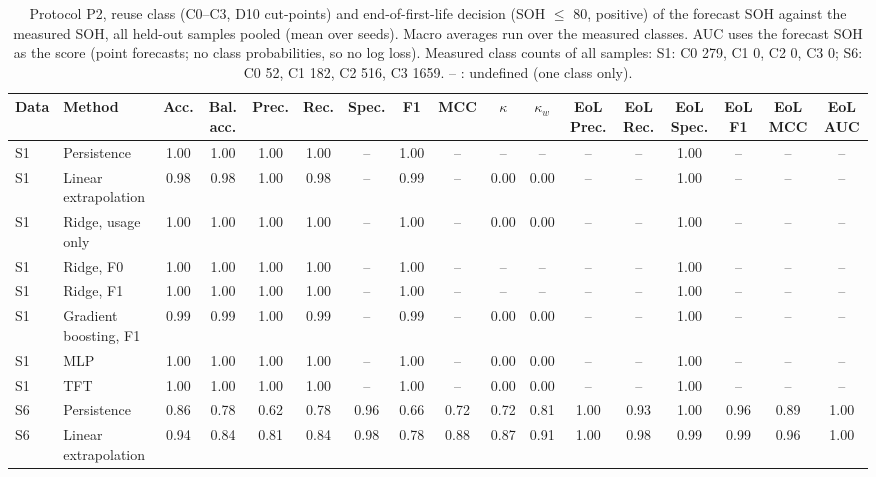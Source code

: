 \begin{table}[t]
  \centering
  \caption{Protocol P2, reuse class (C0--C3, D10 cut-points) and end-of-first-life decision (SOH $\le$ 80, positive) of the forecast SOH against the measured SOH, all held-out samples pooled (mean over seeds). Macro averages run over the measured classes. AUC uses the forecast SOH as the score (point forecasts; no class probabilities, so no log loss). Measured class counts of all samples: S1: C0 279, C1 0, C2 0, C3 0; S6: C0 52, C1 182, C2 516, C3 1659. -- : undefined (one class only).}
  \label{tab:d30_classification}
  \setlength{\tabcolsep}{3pt}
  \scriptsize
  \begin{tabular}{llccccccccccccccc}
    \toprule
    Data & Method & Acc. & Bal. acc. & Prec. & Rec. & Spec. & F1 & MCC & $\kappa$ & $\kappa_w$ & EoL Prec. & EoL Rec. & EoL Spec. & EoL F1 & EoL MCC & EoL AUC \\
    \midrule
    S1 & Persistence & 1.00 & 1.00 & 1.00 & 1.00 & -- & 1.00 & -- & -- & -- & -- & -- & 1.00 & -- & -- & -- \\
    S1 & Linear extrapolation & 0.98 & 0.98 & 1.00 & 0.98 & -- & 0.99 & -- & 0.00 & 0.00 & -- & -- & 1.00 & -- & -- & -- \\
    S1 & Ridge, usage only & 1.00 & 1.00 & 1.00 & 1.00 & -- & 1.00 & -- & 0.00 & 0.00 & -- & -- & 1.00 & -- & -- & -- \\
    S1 & Ridge, F0 & 1.00 & 1.00 & 1.00 & 1.00 & -- & 1.00 & -- & -- & -- & -- & -- & 1.00 & -- & -- & -- \\
    S1 & Ridge, F1 & 1.00 & 1.00 & 1.00 & 1.00 & -- & 1.00 & -- & -- & -- & -- & -- & 1.00 & -- & -- & -- \\
    S1 & Gradient boosting, F1 & 0.99 & 0.99 & 1.00 & 0.99 & -- & 0.99 & -- & 0.00 & 0.00 & -- & -- & 1.00 & -- & -- & -- \\
    S1 & MLP & 1.00 & 1.00 & 1.00 & 1.00 & -- & 1.00 & -- & 0.00 & 0.00 & -- & -- & 1.00 & -- & -- & -- \\
    S1 & TFT & 1.00 & 1.00 & 1.00 & 1.00 & -- & 1.00 & -- & 0.00 & 0.00 & -- & -- & 1.00 & -- & -- & -- \\
    \midrule
    S6 & Persistence & 0.86 & 0.78 & 0.62 & 0.78 & 0.96 & 0.66 & 0.72 & 0.72 & 0.81 & 1.00 & 0.93 & 1.00 & 0.96 & 0.89 & 1.00 \\
    S6 & Linear extrapolation & 0.94 & 0.84 & 0.81 & 0.84 & 0.98 & 0.78 & 0.88 & 0.87 & 0.91 & 1.00 & 0.98 & 0.99 & 0.99 & 0.96 & 1.00 \\

\end{tabular}
\end{table}
